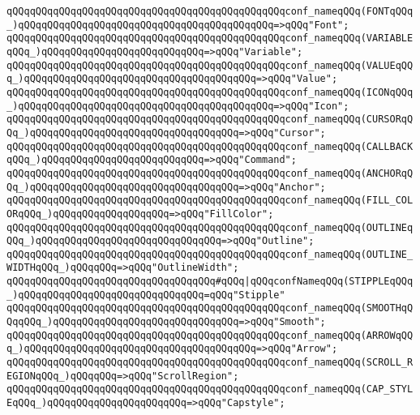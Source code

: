 \verb|qQQqqQQqqQQqqQQqqQQqqQQqqQQqqQQqqQQqqQQqqQQqqQQqconf_nameqQQq(FONTqQQq_)qQQqqQQqqQQqqQQqqQQqqQQqqQQqqQQqqQQqqQQqqQQq=>qQQq"Font";|\newline
\verb|qQQqqQQqqQQqqQQqqQQqqQQqqQQqqQQqqQQqqQQqqQQqqQQqconf_nameqQQq(VARIABLEqQQq_)qQQqqQQqqQQqqQQqqQQqqQQqqQQq=>qQQq"Variable";|\newline
\verb|qQQqqQQqqQQqqQQqqQQqqQQqqQQqqQQqqQQqqQQqqQQqqQQqconf_nameqQQq(VALUEqQQq_)qQQqqQQqqQQqqQQqqQQqqQQqqQQqqQQqqQQqqQQq=>qQQq"Value";|\newline
\verb|qQQqqQQqqQQqqQQqqQQqqQQqqQQqqQQqqQQqqQQqqQQqqQQqconf_nameqQQq(ICONqQQq_)qQQqqQQqqQQqqQQqqQQqqQQqqQQqqQQqqQQqqQQqqQQq=>qQQq"Icon";|\newline
\verb|qQQqqQQqqQQqqQQqqQQqqQQqqQQqqQQqqQQqqQQqqQQqqQQqconf_nameqQQq(CURSORqQQq_)qQQqqQQqqQQqqQQqqQQqqQQqqQQqqQQqqQQq=>qQQq"Cursor";|\newline
\verb|qQQqqQQqqQQqqQQqqQQqqQQqqQQqqQQqqQQqqQQqqQQqqQQqconf_nameqQQq(CALLBACKqQQq_)qQQqqQQqqQQqqQQqqQQqqQQqqQQq=>qQQq"Command";|\newline
\verb|qQQqqQQqqQQqqQQqqQQqqQQqqQQqqQQqqQQqqQQqqQQqqQQqconf_nameqQQq(ANCHORqQQq_)qQQqqQQqqQQqqQQqqQQqqQQqqQQqqQQqqQQq=>qQQq"Anchor";|\newline
\verb|qQQqqQQqqQQqqQQqqQQqqQQqqQQqqQQqqQQqqQQqqQQqqQQqconf_nameqQQq(FILL_COLORqQQq_)qQQqqQQqqQQqqQQqqQQq=>qQQq"FillColor";|\newline
\verb|qQQqqQQqqQQqqQQqqQQqqQQqqQQqqQQqqQQqqQQqqQQqqQQqconf_nameqQQq(OUTLINEqQQq_)qQQqqQQqqQQqqQQqqQQqqQQqqQQqqQQq=>qQQq"Outline";|\newline
\verb|qQQqqQQqqQQqqQQqqQQqqQQqqQQqqQQqqQQqqQQqqQQqqQQqconf_nameqQQq(OUTLINE_WIDTHqQQq_)qQQqqQQq=>qQQq"OutlineWidth";|\newline
\verb|qQQqqQQqqQQqqQQqqQQqqQQqqQQqqQQqqQQq#qQQq|\verb#|qQQqconfNameqQQq(STIPPLEqQQq_)qQQqqQQqqQQqqQQqqQQqqQQqqQQqqQQq=qQQq"Stipple"#\newline
\verb|qQQqqQQqqQQqqQQqqQQqqQQqqQQqqQQqqQQqqQQqqQQqqQQqconf_nameqQQq(SMOOTHqQQqqQQq_)qQQqqQQqqQQqqQQqqQQqqQQqqQQqqQQq=>qQQq"Smooth";|\newline
\verb|qQQqqQQqqQQqqQQqqQQqqQQqqQQqqQQqqQQqqQQqqQQqqQQqconf_nameqQQq(ARROWqQQq_)qQQqqQQqqQQqqQQqqQQqqQQqqQQqqQQqqQQqqQQq=>qQQq"Arrow";|\newline
\verb|qQQqqQQqqQQqqQQqqQQqqQQqqQQqqQQqqQQqqQQqqQQqqQQqconf_nameqQQq(SCROLL_REGIONqQQq_)qQQqqQQq=>qQQq"ScrollRegion";|\newline
\verb|qQQqqQQqqQQqqQQqqQQqqQQqqQQqqQQqqQQqqQQqqQQqqQQqconf_nameqQQq(CAP_STYLEqQQq_)qQQqqQQqqQQqqQQqqQQqqQQq=>qQQq"Capstyle";|\newline
